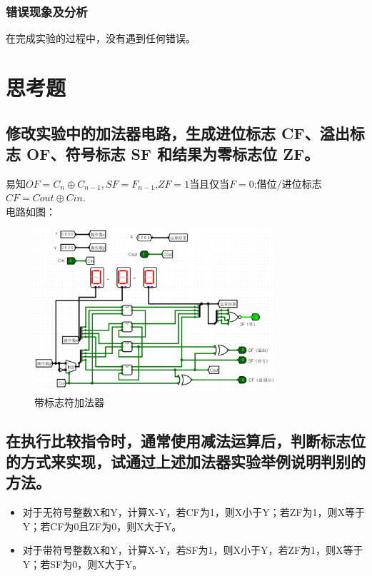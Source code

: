 \documentclass{article}
\begin{document}
    \subsubsection{错误现象及分析}
    在完成实验的过程中，没有遇到任何错误。
    
    \section{思考题}

    \subsection{修改实验中的加法器电路，生成进位标志 CF、溢出标志 OF、符号标志 SF 和结果为零标志位 ZF。}
    易知$OF=C_{n}\oplus C_{n-1},SF=F_{n-1}$,$ZF =1$当且仅当$F=0$;借位/进位标志$CF=Cout\oplus Cin .$\\
    电路如图：
    \begin{figure}[H]
    \centering
    \includegraphics[width=0.8\textwidth]{7.1.png}
    \caption{带标志符加法器}
    \end{figure}
    
    \subsection{在执行比较指令时，通常使用减法运算后，判断标志位的方式来实现，试通过上述加法器实验举例说明判别的方法。}
    \begin{itemize}
        \item 对于无符号整数X和Y，计算X-Y，若CF为1，则X小于Y；若ZF为1，则X等于Y；若CF为0且ZF为0，则X大于Y。
        \item 对于带符号整数X和Y，计算X-Y，若SF为1，则X小于Y，若ZF为1，则X等于Y；若SF为0，则X大于Y。
    \end{itemize}
    
\end{document}
